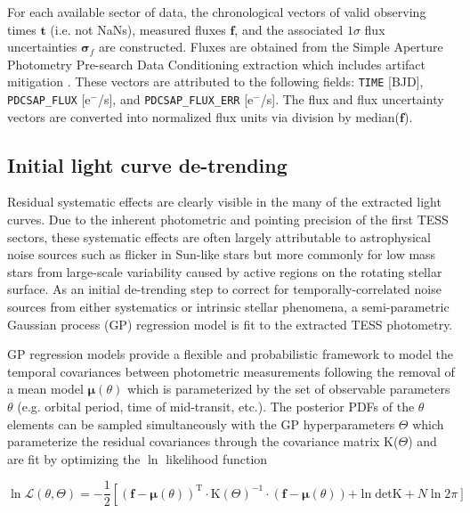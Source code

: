For each available sector of data, the chronological vectors of valid observing times $\mathbf{t}$
(i.e. not NaNs), measured fluxes $\mathbf{f}$, and the associated $1\sigma$ flux
uncertainties $\boldsymbol{\sigma}_{f}$ are constructed. Fluxes are obtained from the Simple Aperture Photometry Pre-search
Data Conditioning extraction which includes artifact mitigation \citep{smith12}. These vectors are
attributed to the following fields: \texttt{TIME} [BJD], \texttt{PDCSAP\_FLUX} [e$^-$/s], and
\texttt{PDCSAP\_FLUX\_ERR} [e$^-$/s]. The flux and flux uncertainty vectors are converted into normalized
flux units via division by median($\mathbf{f}$).

\subsection{Initial light curve de-trending} \label{sect:detrend}
Residual systematic effects are clearly visible in the many of the extracted light curves. Due to the
inherent photometric and pointing precision of the first TESS sectors, these systematic effects
are often largely attributable to astrophysical noise sources such as flicker \citep{bastien13} in
Sun-like stars but more commonly for low mass stars from
large-scale variability caused by active regions on the rotating stellar surface. As an initial de-trending step
to correct for temporally-correlated noise sources from either systematics or intrinsic stellar phenomena,
a semi-parametric Gaussian process (GP) regression model is fit to the extracted TESS photometry.

GP regression models provide a flexible and probabilistic framework to model the temporal
covariances between photometric measurements following the removal of a mean model
$\boldsymbol{\mu}(\theta)$ which is parameterized by the set of observable parameters $\theta$
(e.g. orbital period, time of mid-transit, etc.). The posterior PDFs of the $\theta$ elements 
can be sampled simultaneously with the GP hyperparameters $\Theta$ which parameterize
the residual covariances through the covariance matrix K($\Theta$) and are fit by
optimizing the $\ln$ likelihood function

\begin{equation}
  \ln{\mathcal{L}(\theta,\Theta)} = 
  -\frac{1}{2} \left[ (\mathbf{f}-\boldsymbol{\mu}(\theta))^{\text{T}}
    \cdot \text{K}(\Theta)^{-1} \cdot (\mathbf{f}-\boldsymbol{\mu}(\theta)) \right. 
    \left. + \ln{\mathrm{det} \text{K}} + N \ln{2 \pi} \right] \label{eq:lnL}
\end{equation}

